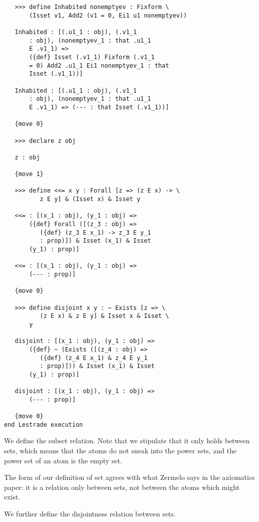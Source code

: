 \documentclass[12pt]{article}
\begin{document}
\begin{verbatim}
   >>> define Inhabited nonemptyev : Fixform \
       (Isset v1, Add2 (v1 = 0, Ei1 u1 nonemptyev))

   Inhabited : [(.u1_1 : obj), (.v1_1 
       : obj), (nonemptyev_1 : that .u1_1 
       E .v1_1) => 
       ({def} Isset (.v1_1) Fixform (.v1_1 
       = 0) Add2 .u1_1 Ei1 nonemptyev_1 : that 
       Isset (.v1_1))]

   Inhabited : [(.u1_1 : obj), (.v1_1 
       : obj), (nonemptyev_1 : that .u1_1 
       E .v1_1) => (--- : that Isset (.v1_1))]

   {move 0}

   >>> declare z obj

   z : obj

   {move 1}

   >>> define <<= x y : Forall [z => (z E x) -> \
          z E y] & (Isset x) & Isset y

   <<= : [(x_1 : obj), (y_1 : obj) => 
       ({def} Forall ([(z_3 : obj) => 
          ({def} (z_3 E x_1) -> z_3 E y_1 
          : prop)]) & Isset (x_1) & Isset 
       (y_1) : prop)]

   <<= : [(x_1 : obj), (y_1 : obj) => 
       (--- : prop)]

   {move 0}

   >>> define disjoint x y : ~ Exists [z => \
          (z E x) & z E y] & Isset x & Isset \
       y

   disjoint : [(x_1 : obj), (y_1 : obj) => 
       ({def} ~ (Exists ([(z_4 : obj) => 
          ({def} (z_4 E x_1) & z_4 E y_1 
          : prop)])) & Isset (x_1) & Isset 
       (y_1) : prop)]

   disjoint : [(x_1 : obj), (y_1 : obj) => 
       (--- : prop)]

   {move 0}
end Lestrade execution
\end{verbatim}

We define the subset relation.  Note that we stipulate that it only holds between sets, which means that the atoms do not sneak into the power sets,
and the power set of an atom is the empty set.

The form of our definition of set agrees with what Zermelo says in the axiomatics paper:  it is a relation only between sets, not between the atoms which might exist. 

We further define the disjointness relation between sets.
\end{document}
